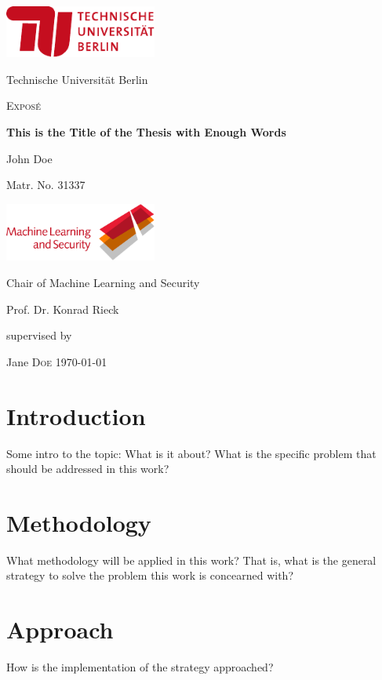 \documentclass[a4paper, 12pt]{article}
\newcommand{\thesistitle}{This is the Title of the Thesis with Enough Words}
\newcommand{\thesisauthor}{John Doe}
\newcommand{\matrno}{31337}
\newcommand{\supervisor}{Jane \textsc{Doe}}
\begin{document}
\begin{titlepage}
	\centering
	\includegraphics[width=5cm]{tub-logo}\par\vspace{0.5cm}
	{Technische Universität Berlin \par}
	\vspace{2cm}
	{\large \textsc{Exposé}\par}
	\vspace{1cm}
	{\Large\bfseries \thesistitle\par}
	\vspace{2cm}
	{\large \thesisauthor\par}
	{\large Matr. No. \matrno\par}
	\vspace{2cm}
	\includegraphics[width=5cm]{mlsec-logo-red2}\par\vspace{0.5cm}
	{Chair of Machine Learning and Security \par}
	{Prof. Dr. Konrad Rieck \par}
	\vfill
	supervised by\par
	\supervisor
	\vfill
	\today\par
\end{titlepage}

\section{Introduction}
Some intro to the topic: What is it about? What is the specific problem that
should be addressed in this work?

\section{Methodology}
What methodology will be applied in this work? That is, what is the general
strategy to solve the problem this work is concearned with?

\section{Approach}
How is the implementation of the strategy approached?
\end{document}
